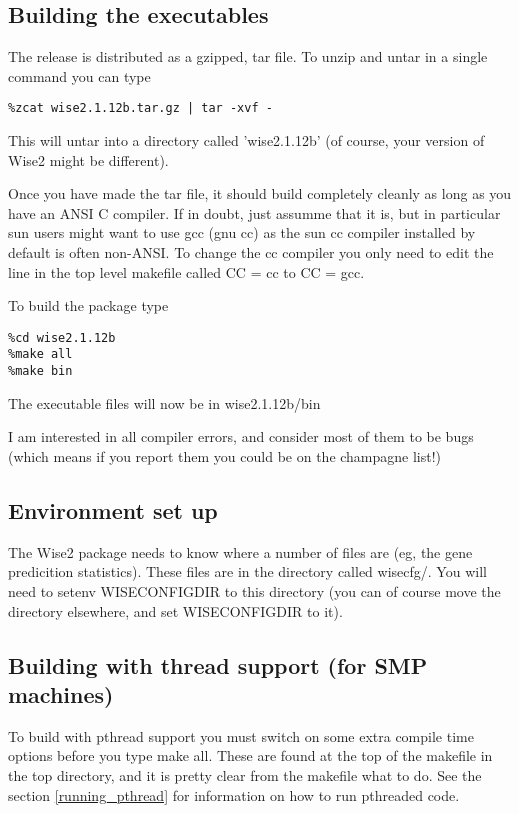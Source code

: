 \documentclass{article}
\begin{document}
\subsection{Building the executables}
The release is distributed as a gzipped, tar file. To
unzip and untar in a single command you can type

\begin{verbatim}
%zcat wise2.1.12b.tar.gz | tar -xvf - 
\end{verbatim}

This will untar into a directory called 'wise2.1.12b'
(of course, your version of Wise2 might be different). 

Once you have made the tar file, it should build completely cleanly as
long as you have an ANSI C compiler. If in doubt, just assumme that it
is, but in particular sun users might want to use gcc (gnu cc) as the
sun cc compiler installed by default is often non-ANSI. To change the
cc compiler you only need to edit the line in the top level makefile
called CC = cc to CC = gcc.


To build the package type
\begin{verbatim}
%cd wise2.1.12b
%make all
%make bin
\end{verbatim}

The executable files will now be in wise2.1.12b/bin


I am interested in all compiler errors, and consider most of them
to be bugs (which means if you report them you could be on the
champagne list!)

\subsection{Environment set up}

The Wise2 package needs to know where a number of files are (eg, 
the gene predicition statistics). These files are in the directory
called wisecfg/. You will need to setenv WISECONFIGDIR to this
directory (you can of course move the directory elsewhere, and set
WISECONFIGDIR to it).

\subsection{Building with thread support (for SMP machines)}
\label{compile_pthread}
To build with pthread support you must switch on some extra
compile time options before you type make all. These are found
at the top of the makefile in the top directory, and it is
pretty clear from the makefile what to do. See the section \ref{running_pthread}
for information on how to run pthreaded code.
\end{document}

